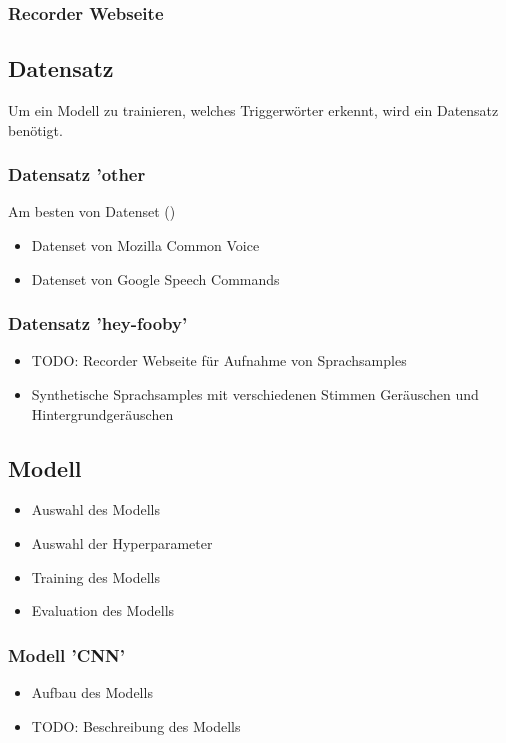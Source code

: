 \documentclass[11pt,a4paper]{article}
\begin{document}
\subsubsection{Recorder Webseite}

\subsection{Datensatz}
Um ein Modell zu trainieren, welches Triggerwörter erkennt, wird ein Datensatz benötigt.

\subsubsection{Datensatz 'other}
Am besten von Datenset (\cite{warden2018speech})
\begin{itemize}
    \item Datenset von Mozilla Common Voice
    \item Datenset von Google Speech Commands
\end{itemize}

\subsubsection{Datensatz 'hey-fooby'}
\begin{itemize}
    \item TODO: Recorder Webseite für Aufnahme von Sprachsamples
    \item Synthetische Sprachsamples mit verschiedenen Stimmen Geräuschen und Hintergrundgeräuschen
\end{itemize}

\subsection{Modell}
\begin{itemize}
    \item Auswahl des Modells
    \item Auswahl der Hyperparameter
    \item Training des Modells
    \item Evaluation des Modells
\end{itemize}

\subsubsection{Modell 'CNN'}
\begin{itemize}
    \item Aufbau des Modells 
    \item TODO: Beschreibung des Modells
\end{itemize}
\end{document}
